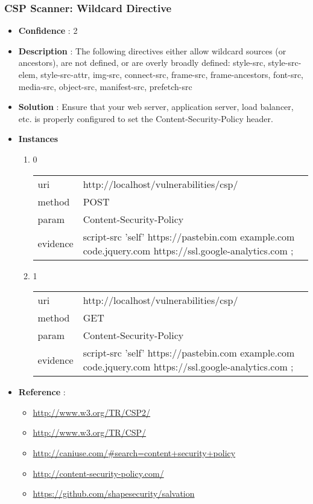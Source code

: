 \documentclass[10pt]{article}
\begin{document}
\subsubsection{CSP Scanner: Wildcard Directive}
\begin{itemize}
\item[] \textbf{Confidence} : 2
\item[] \textbf{Description} : The following directives either allow wildcard sources (or ancestors), are not defined, or are overly broadly defined: style-src, style-src-elem, style-src-attr, img-src, connect-src, frame-src, frame-ancestors, font-src, media-src, object-src, manifest-src, prefetch-src
\item[] \textbf{Solution} :  Ensure that your web server, application server, load balancer, etc. is properly configured to set the Content-Security-Policy header.
\item[] \textbf{Instances}
\begin{enumerate}
\item[] 0
\begin{tabular}{| l | p{12cm}}
uri & http://localhost/vulnerabilities/csp/ \\
method & POST \\
param & Content-Security-Policy \\
evidence & script-src 'self' https://pastebin.com  example.com code.jquery.com https://ssl.google-analytics.com ; \\
\end{tabular}
\item[] 1
\begin{tabular}{| l | p{12cm}}
uri & http://localhost/vulnerabilities/csp/ \\
method & GET \\
param & Content-Security-Policy \\
evidence & script-src 'self' https://pastebin.com  example.com code.jquery.com https://ssl.google-analytics.com ; \\
\end{tabular}
\end{enumerate}
\item[] \textbf{Reference} : 
\begin{itemize}
\item \url{http://www.w3.org/TR/CSP2/}
\item \url{http://www.w3.org/TR/CSP/}
\item \url{http://caniuse.com/\#search=content+security+policy}
\item \url{http://content-security-policy.com/}
\item \url{https://github.com/shapesecurity/salvation}
\end{itemize}
\end{itemize}
\end{document}
